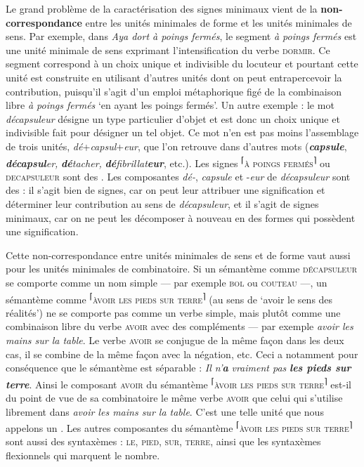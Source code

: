 Le grand problème de la caractérisation des signes minimaux vient de la \textbf{non-correspondance} entre les unités minimales de forme et les unités minimales de sens. Par exemple, dans \textit{Aya dort à poings fermés}, le segment \textit{à poings fermés} est une unité minimale de sens exprimant l’intensification du verbe \textsc{dormir}. Ce segment correspond à un choix unique et indivisible du locuteur et pourtant cette unité est construite en utilisant d’autres unités dont on peut entrapercevoir la contribution, puisqu’il s’agit d’un emploi métaphorique figé de la combinaison libre \textit{à poings fermés} ‘en ayant les poings fermés’. Un autre exemple : le mot \textit{décapsuleur} désigne un type particulier d’objet et est donc un choix unique et indivisible fait pour désigner un tel objet. Ce mot n’en est pas moins l’assemblage de trois unités, \textit{dé}+\textit{capsul}+\textit{eur}, que l’on retrouve dans d’autres mots (\textbf{\textit{capsule}}, \textbf{\textit{décapsul}}\textit{er,} \textbf{\textit{dé}}\textit{tacher,} \textbf{\textit{dé}}\textit{fibrillat}\textbf{\textit{eur}}, etc.). Les signes \textsuperscript{⌈}\textsc{à} \textsc{poings} \textsc{fermés}\textsuperscript{⌉} ou \textsc{decapsuleur} sont des . Les composantes \textit{dé-}, \textit{capsule} et -\textit{eur} de \textit{décapsuleur} sont des : il s’agit bien de signes, car on peut leur attribuer une signification et déterminer leur contribution au sens de \textit{décapsuleur}, et il s’agit de signes minimaux, car on ne peut les décomposer à nouveau en des formes qui possèdent une signification.

Cette non-correspondance entre unités minimales de sens et de forme vaut aussi pour les unités minimales de combinatoire. Si un sémantème comme \textsc{décapsuleur} se comporte comme un nom simple — par exemple \textsc{bol} ou \textsc{couteau} —, un sémantème comme \textsuperscript{⌈}\textsc{àvoir} \textsc{les} \textsc{pieds} \textsc{sur} \textsc{terre}\textsuperscript{⌉} (au sens de ‘avoir le sens des réalités’) ne se comporte pas comme un verbe simple, mais plutôt comme une combinaison libre du verbe \textsc{avoir} avec des compléments — par exemple \textit{avoir les mains sur la table}. Le verbe \textsc{avoir} se conjugue de la même façon dans les deux cas, il se combine de la même façon avec la négation, etc. Ceci a notamment pour conséquence que le sémantème est séparable : \textit{Il n’}\textbf{\textit{a}} \textit{vraiment pas} \textbf{\textit{les pieds sur terre}}. Ainsi le composant \textsc{avoir} du sémantème \textsuperscript{⌈}\textsc{àvoir} \textsc{les} \textsc{pieds} \textsc{sur} \textsc{terre}\textsuperscript{⌉} est-il du point de vue de sa combinatoire le même verbe \textsc{avoir} que celui qui s’utilise librement dans \textit{avoir les mains sur la table}. C’est une telle unité que nous appelons un . Les autres composantes du sémantème \textsuperscript{⌈}\textsc{àvoir} \textsc{les} \textsc{pieds} \textsc{sur} \textsc{terre}\textsuperscript{⌉} sont aussi des syntaxèmes : \textsc{le,} \textsc{pied,} \textsc{sur,} \textsc{terre}, ainsi que les syntaxèmes flexionnels qui marquent le nombre.

